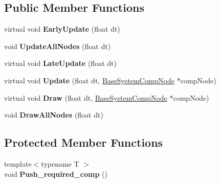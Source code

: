 \subsection*{Public Member Functions}
\begin{DoxyCompactItemize}
\item 
\mbox{\label{classBaseSystem_a202ed394e663f970f181d810c86760dc}} 
virtual void {\bfseries Early\+Update} (float dt)
\item 
\mbox{\label{classBaseSystem_a6422693fc429d74a2b0b4c4e860d1810}} 
void {\bfseries Update\+All\+Nodes} (float dt)
\item 
\mbox{\label{classBaseSystem_ab6520975a6376e59005d3a40456358d4}} 
virtual void {\bfseries Late\+Update} (float dt)
\item 
\mbox{\label{classBaseSystem_a465191589a1ef8b8f3a8e20fa4656d47}} 
virtual void {\bfseries Update} (float dt, \hyperlink{structBaseSystemCompNode}{Base\+System\+Comp\+Node} $\ast$comp\+Node)
\item 
\mbox{\label{classBaseSystem_a94339337789820c707da572d140a0923}} 
virtual void {\bfseries Draw} (float dt, \hyperlink{structBaseSystemCompNode}{Base\+System\+Comp\+Node} $\ast$comp\+Node)
\item 
\mbox{\label{classBaseSystem_af8f5ce5a033d06bd9aeb944d2a193e74}} 
void {\bfseries Draw\+All\+Nodes} (float dt)
\end{DoxyCompactItemize}
\subsection*{Protected Member Functions}
\begin{DoxyCompactItemize}
\item 
\mbox{\label{classBaseSystem_a672d8b7902414c5a4b46d10f5f403785}} 
{\footnotesize template$<$typename T $>$ }\\void {\bfseries Push\+\_\+required\+\_\+comp} ()
\end{DoxyCompactItemize}
